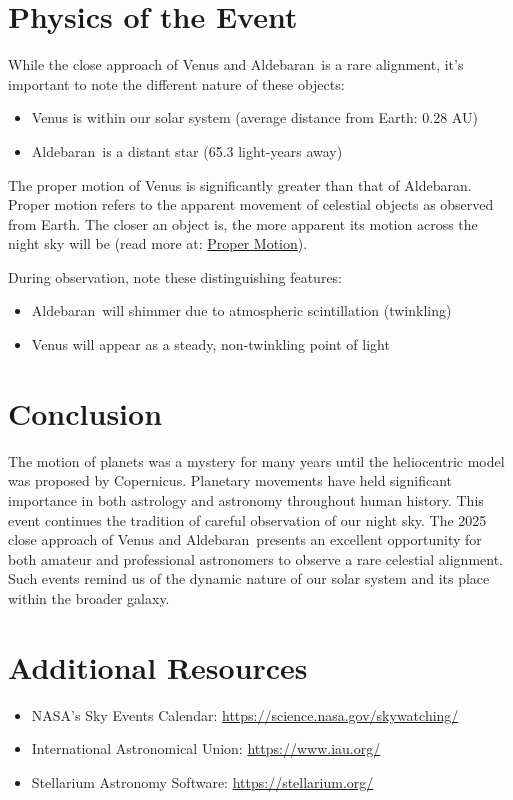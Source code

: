 \documentclass[12pt,oneside,a4paper,english]{article}
\newcommand{\Aldebaran}{Aldebaran}
\begin{document}
\section{Physics of the Event}
While the close approach of Venus and \Aldebaran\ is a rare alignment, it's important to note the different nature of these objects:

\begin{itemize}
\item Venus is within our solar system (average distance from Earth: 0.28 AU)
\item \Aldebaran\ is a distant star (65.3 light-years away)
\end{itemize}

The proper motion of Venus is significantly greater than that of \Aldebaran. Proper motion refers to the apparent movement of celestial objects as observed from Earth. The closer an object is, the more apparent its motion across the night sky will be (read more at: \href{https://en.wikipedia.org/wiki/Proper_motion}{Proper Motion}).

During observation, note these distinguishing features:
\begin{itemize}
\item \Aldebaran\ will shimmer due to atmospheric scintillation (twinkling)
\item Venus will appear as a steady, non-twinkling point of light
\end{itemize}

\section{Conclusion}
The motion of planets was a mystery for many years until the heliocentric model was proposed by Copernicus. Planetary movements have held significant importance in both astrology and astronomy throughout human history. This event continues the tradition of careful observation of our night sky. The 2025 close approach of Venus and \Aldebaran\ presents an excellent opportunity for both amateur and professional astronomers to observe a rare celestial alignment. Such events remind us of the dynamic nature of our solar system and its place within the broader galaxy.

\section*{Additional Resources}
\begin{itemize}
\item NASA's Sky Events Calendar: \url{https://science.nasa.gov/skywatching/}
\item International Astronomical Union: \url{https://www.iau.org/}
\item Stellarium Astronomy Software: \url{https://stellarium.org/}
\end{itemize}
\end{document}
